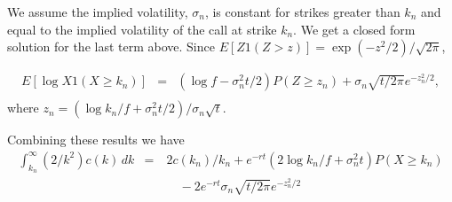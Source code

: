 \documentclass[11pt,fleqn]{amsart}
\begin{document}
We assume the implied volatility, $\sigma_n$, is constant for strikes
greater than $k_n$ and equal to the implied volatility of the call
at strike $k_n$. We get a closed form solution for the
last term above. Since $E[Z 1(Z > z)] = \exp(-z^2/2)/\sqrt{2\pi}$,

\begin{eqnarray*}
	E[\log X 1(X \ge k_n)] &=& (\log f - \sigma_n^2 t/2) P(Z \ge z_n)
		+ \sigma_n\sqrt{t/2\pi} e^{-z_n^2/2}, \\
\end{eqnarray*}
where $z_n = (\log k_n/f + \sigma_n^2 t/2)/\sigma_n\sqrt{t}$.

Combining these results we have
\begin{eqnarray*}
	\int_{k_n}^\infty (2/k^2) c(k)\,dk
	&=& 2c(k_n)/k_n + e^{-rt}(2\log k_n/f + \sigma_n^2 t) P(X \ge k_n) \\
	&\quad&\quad - 2e^{-rt}\sigma_n\sqrt{t/2\pi} e^{-z_n^2/2} \\
\end{eqnarray*}
\end{document}
